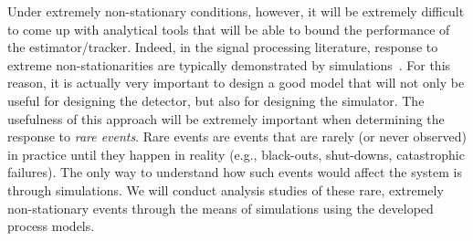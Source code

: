 Under extremely non-stationary conditions, however, it will be extremely
difficult to come up with analytical tools that will be able to bound the
performance of the estimator/tracker. Indeed, in the signal processing
literature, response to extreme non-stationarities are typically
demonstrated by simulations~\cite{BinYang,Toshi}. For this reason, it is
actually very important to design a good model that will not only be useful
for designing the detector, but also for designing the simulator.  The
usefulness of this approach will be extremely important when determining
the response to {\em rare events}. Rare events are events that are rarely
(or never observed) in practice until they happen in reality (e.g.,
black-outs, shut-downs, catastrophic failures). The only way to understand
how such events would affect the system is through simulations. We will
conduct analysis studies of these rare, extremely non-stationary events
through the means of simulations using the developed process models.
